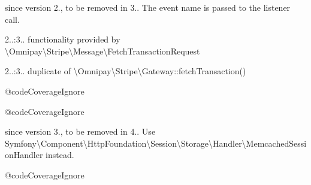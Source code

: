 \begin{DoxyRefList}
%
since version 2., to be removed in 3.. The event name is passed to the listener call.  
\item[Class \mbox{\hyperlink{class_omnipay_1_1_stripe_1_1_message_1_1_fetch_charge_request}{Fetch\+Charge\+Request}} ]\label{deprecated__deprecated000037}%
%
2..\+:3.. functionality provided by \textbackslash{}\+Omnipay\textbackslash{}\+Stripe\textbackslash{}\+Message\textbackslash{}\+Fetch\+Transaction\+Request  
\item[Global \mbox{\hyperlink{class_omnipay_1_1_stripe_1_1_gateway_ad39ffa7e22598fb5c83339a8fe31dddd}{Gateway\+::fetch\+Charge}} (array \$parameters=array())]\label{deprecated__deprecated000034}%
%
2..\+:3.. duplicate of \textbackslash{}\+Omnipay\textbackslash{}\+Stripe\textbackslash{}\+Gateway\+::fetch\+Transaction()  
\item[Global \mbox{\hyperlink{class_guzzle_1_1_http_1_1_message_1_1_header_a8f3e30b90a18e79084e7d8401d7d217b}{Header\+::has\+Exact\+Header}} (\$header)]\label{deprecated__deprecated000016}%
%
 @code\+Coverage\+Ignore  
\item[Global \mbox{\hyperlink{class_guzzle_1_1_http_1_1_message_1_1_header_a15743d6a62eea81015a20e703eb9f80a}{Header\+::raw}} ()]\label{deprecated__deprecated000017}%
%
 @code\+Coverage\+Ignore  
\item[Class \mbox{\hyperlink{class_symfony_1_1_component_1_1_http_foundation_1_1_session_1_1_storage_1_1_handler_1_1_memcache_session_handler}{Memcache\+Session\+Handler}} ]\label{deprecated__deprecated000056}%
%
since version 3., to be removed in 4.. Use Symfony\textbackslash{}\+Component\textbackslash{}\+Http\+Foundation\textbackslash{}\+Session\textbackslash{}\+Storage\textbackslash{}\+Handler\textbackslash{}\+Memcached\+Session\+Handler instead.  
\item[Class \mbox{\hyperlink{class_guzzle_1_1_log_1_1_monolog_log_adapter}{Monolog\+Log\+Adapter}} ]\label{deprecated__deprecated000026}%
%
 @code\+Coverage\+Ignore  
\item[Class \mbox{\hyperlink{class_symfony_1_1_component_1_1_http_foundation_1_1_session_1_1_storage_1_1_proxy_1_1_native_proxy}{Native\+Proxy}} ]\label{deprecated__deprecated000059}%
%

\end{DoxyRefList}
